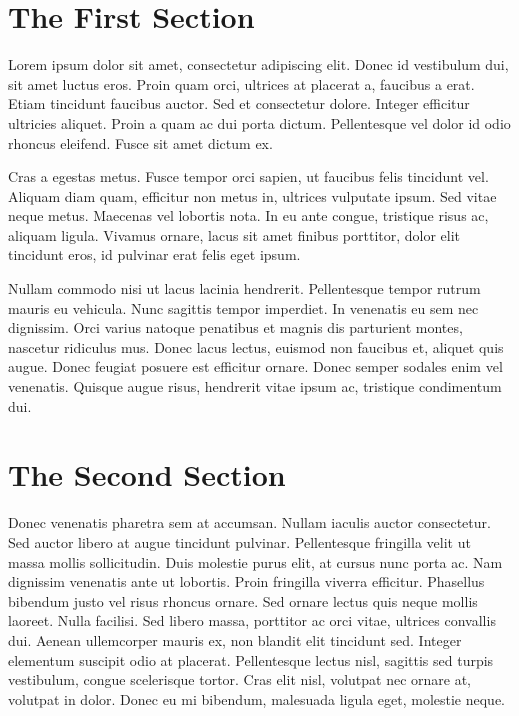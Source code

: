 \documentclass{article}
\begin{document}
\section{The First Section}

Lorem ipsum dolor sit amet, consectetur adipiscing elit. Donec id vestibulum
dui, sit amet luctus eros. Proin quam orci, ultrices at placerat a, faucibus a
erat. Etiam tincidunt faucibus auctor. Sed et consectetur dolore. Integer
efficitur ultricies aliquet. Proin a quam ac dui porta dictum. Pellentesque vel
dolor id odio rhoncus eleifend. Fusce sit amet dictum ex.

Cras a egestas metus. Fusce tempor orci sapien, ut faucibus felis tincidunt vel.
Aliquam diam quam, efficitur non metus in, ultrices vulputate ipsum. Sed vitae
neque metus. Maecenas vel lobortis nota. In eu ante congue, tristique risus ac,
aliquam ligula. Vivamus ornare, lacus sit amet finibus porttitor, dolor elit
tincidunt eros, id pulvinar erat felis eget ipsum.

Nullam commodo nisi ut lacus lacinia hendrerit.  Pellentesque tempor rutrum
mauris eu vehicula. Nunc sagittis tempor imperdiet.  In venenatis eu sem nec
dignissim. Orci varius natoque penatibus et magnis dis parturient montes,
nascetur ridiculus mus. Donec lacus lectus, euismod non faucibus et, aliquet
quis augue. Donec feugiat posuere est efficitur ornare.  Donec semper sodales
enim vel venenatis. Quisque augue risus, hendrerit vitae ipsum ac, tristique
condimentum dui.

\section{The Second Section}

Donec venenatis pharetra sem at accumsan. Nullam iaculis auctor consectetur.
Sed auctor libero at augue tincidunt pulvinar. Pellentesque fringilla velit ut
massa mollis sollicitudin. Duis molestie purus elit, at cursus nunc porta ac.
Nam dignissim venenatis ante ut lobortis. Proin fringilla viverra efficitur.
Phasellus bibendum justo vel risus rhoncus ornare. Sed ornare lectus quis neque
mollis laoreet. Nulla facilisi. Sed libero massa, porttitor ac orci vitae,
ultrices convallis dui. Aenean ullemcorper mauris ex, non blandit elit
tincidunt sed. Integer elementum suscipit odio at placerat. Pellentesque lectus
nisl, sagittis sed turpis vestibulum, congue scelerisque tortor. Cras elit
nisl, volutpat nec ornare at, volutpat in dolor. Donec eu mi bibendum,
malesuada ligula eget, molestie neque.
\end{document}
